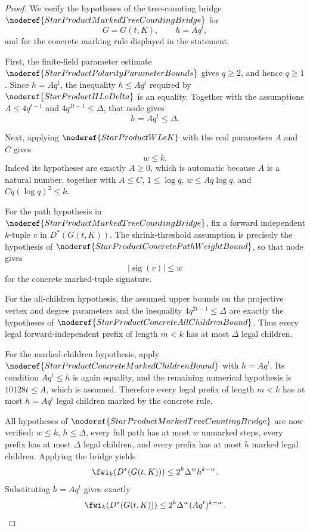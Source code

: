 \begin{proof}
We verify the hypotheses of the tree-counting bridge
\(\noderef{StarProductMarkedTreeCountingBridge}\) for
\[
  G=G(t,K),\qquad
  h=Aq^t,
\]
and for the concrete marking rule displayed in the statement.

First, the finite-field parameter estimate
\(\noderef{StarProductPolarityParameterBounds}\) gives \(q\ge2\), and hence
\(q\ge1\).  Since \(h=Aq^t\), the inequality \(h\le Aq^t\) required by
\(\noderef{StarProductHLeDelta}\) is an equality.  Together with the
assumptions \(A\le4q^{t-1}\) and \(4q^{2t-1}\le\Delta\), that node gives
\[
  h=Aq^t\le\Delta.
\]

Next, applying \(\noderef{StarProductWLeK}\) with the real parameters
\(A\) and \(C\) gives
\[
  w\le k.
\]
Indeed its hypotheses are exactly \(A\ge0\), which is automatic because
\(A\) is a natural number, together with \(A\le C\), \(1\le\log q\),
\(w\le Aq\log q\), and \(Cq(\log q)^2\le k\).

For the path hypothesis in
\(\noderef{StarProductMarkedTreeCountingBridge}\), fix a forward independent
\(k\)-tuple \(v\) in \(D^*(G(t,K))\).  The shrink-threshold assumption is
precisely the hypothesis of
\(\noderef{StarProductConcretePathWeightBound}\), so that node gives
\[
  \bigl|\operatorname{sig}(v)\bigr|\le w
\]
for the concrete marked-tuple signature.

For the all-children hypothesis, the assumed upper bounds on the projective
vertex and degree parameters and the inequality \(4q^{2t-1}\le\Delta\) are
exactly the hypotheses of \(\noderef{StarProductConcreteAllChildrenBound}\).
Thus every legal forward-independent prefix of length \(m<k\) has at most
\(\Delta\) legal children.

For the marked-children hypothesis, apply
\(\noderef{StarProductConcreteMarkedChildrenBound}\) with \(h=Aq^t\).  Its
condition \(Aq^t\le h\) is again equality, and the remaining numerical
hypothesis is \(10128t\le A\), which is assumed.  Therefore every legal
prefix of length \(m<k\) has at most \(h=Aq^t\) legal children marked by the
concrete rule.

All hypotheses of \(\noderef{StarProductMarkedTreeCountingBridge}\) are now
verified: \(w\le k\), \(h\le\Delta\), every full path has at most \(w\)
unmarked steps, every prefix has at most \(\Delta\) legal children, and every
prefix has at most \(h\) marked legal children.  Applying the bridge yields
\[
  \fwi_k(D^*(G(t,K)))\le 2^k\Delta^w h^{k-w}.
\]
Substituting \(h=Aq^t\) gives exactly
\[
  \fwi_k(D^*(G(t,K)))\le 2^k\Delta^w(Aq^t)^{k-w}.
\]
\end{proof}
